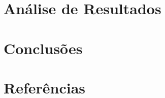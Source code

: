 \documentclass[10pt]{article}
\begin{document}
\section{Análise de Resultados}\label{sec:ev-da-org}

\vspace{6cm}
\section{Conclusões}\label{sec:an-da-info-fin-da-org}

\vspace{3cm}

\newpage

\section{Referências}\label{sec:sup-inf-utl}
\cite{Binance:2021}



\pagebreak
\end{document}
